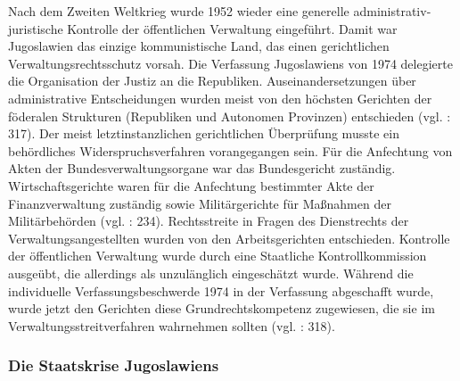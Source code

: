 Nach dem Zweiten Weltkrieg wurde 1952 wieder eine generelle administrativ-juristische Kontrolle der öffentlichen Verwaltung eingeführt. Damit war Jugoslawien das einzige kommunistische Land, das einen gerichtlichen Verwaltungsrechtsschutz vorsah. Die Verfassung Jugoslawiens von 1974 delegierte die Organisation der Justiz an die Republiken. Auseinandersetzungen über administrative Entscheidungen wurden meist von den höchsten Gerichten der föderalen Strukturen (Republiken und Autonomen Provinzen) entschieden (vgl. \cite{roggemann} : 317). Der meist letztinstanzlichen gerichtlichen Überprüfung musste ein behördliches Widerspruchsverfahren vorangegangen sein. Für die Anfechtung von Akten der Bundesverwaltungsorgane war das Bundesgericht zuständig. Wirtschaftsgerichte waren für die Anfechtung bestimmter Akte der Finanzverwaltung zuständig sowie Militärgerichte für Maßnahmen der Militärbehörden (vgl. \cite{beckm90} : 234). Rechtsstreite in Fragen des Dienstrechts der Verwaltungsangestellten wurden von den Arbeitsgerichten entschieden. Kontrolle der öffentlichen Verwaltung wurde durch eine Staatliche Kontrollkommission ausgeübt, die allerdings als unzulänglich eingeschätzt wurde. Während die individuelle Verfassungsbeschwerde 1974 in der Verfassung abgeschafft wurde, wurde jetzt den Gerichten diese Grundrechtskompetenz zugewiesen, die sie im Verwaltungsstreitverfahren wahrnehmen sollten (vgl. \cite{roggemann} : 318).

\subsubsection{Die Staatskrise Jugoslawiens}

